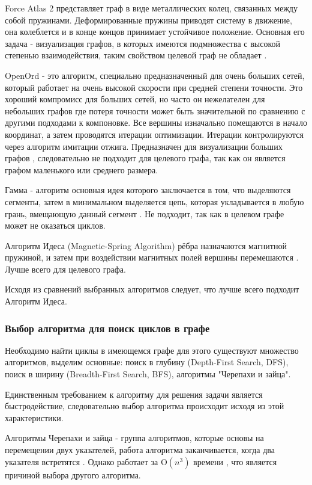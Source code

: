 Force Atlas 2 представляет граф в виде металлических колец, связанных между собой пружинами. Деформированные пружины приводят систему в движение, она колеблется и в конце концов принимает устойчивое положение. Основная его задача - визуализация графов, в которых имеются подмножества с высокой степенью взаимодействия, таким свойством целевой граф не обладает \cite{alg-force-atlas-2}.

OpenOrd - это алгоритм, специально предназначенный для очень больших сетей, который работает на очень высокой скорости при средней степени точности. Это хороший компромисс для больших сетей, но часто он нежелателен для небольших графов где потеря точности может быть значительной по сравнению с другими подходами к компоновке. Все вершины изначально помещаются в начало координат, а затем проводятся итерации оптимизации. Итерации контролируются через алгоритм имитации отжига. Предназначен для визуализации больших графов \cite{alg-open-ord}, следовательно не подходит для целевого графа, так как он является графом маленького или среднего размера.

Гамма - алгоритм основная идея которого заключается в том, что выделяются сегменты, затем в минимальном выделяется цепь, которая укладывается в любую грань, вмещающую данный сегмент \cite{alg-gamma}. Не подходит, так как в целевом графе может не оказаться циклов.

Алгоритм Идеса (Magnetic-Spring Algorithm) рёбра назначаются магнитной пружиной, и затем при воздействии магнитных полей вершины перемешаются \cite{alg-eades}. Лучше всего для целевого графа.

Исходя из сравнений выбранных алгоритмов следует, что лучше всего подходит Алгоритм Идеса.

\subsubsection{Выбор алгоритма для поиск циклов в графе}
Необходимо найти циклы в имеющемся графе для этого существуют множество алгоритмов, выделим основные: поиск в глубину (Depth-First Search, DFS), поиск в ширину (Breadth-First Search, BFS), алгоритмы "Черепахи и зайца".

Единственным требованием к алгоритму для решения задачи является быстродействие, следовательно выбор алгоритма происходит исходя из этой характеристики.

Алгоритмы Черепахи и зайца - группа алгоритмов, которые основы на перемещении двух указателей, работа алгоритма заканчивается, когда два указателя встретятся \cite{alg-search}. Однако работает за O$(n^3)$ времени \cite{alg-floyd}, что является причиной выбора другого алгоритма.


